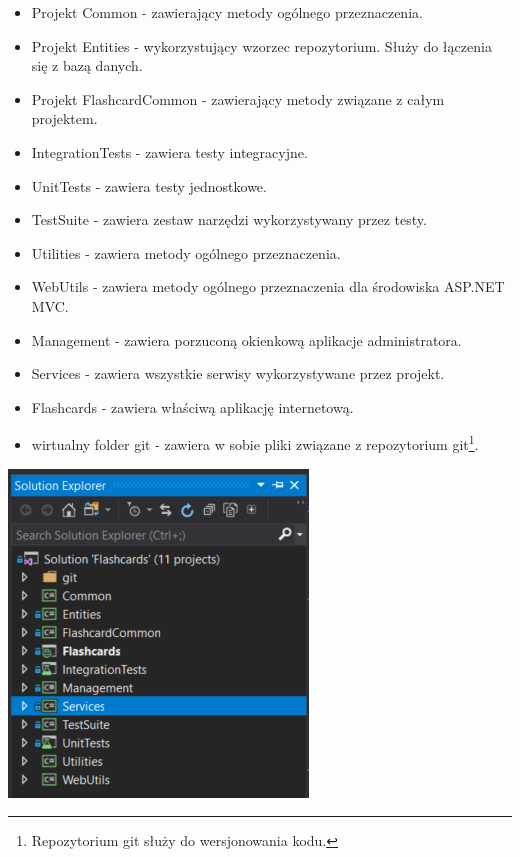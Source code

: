 \begin{itemize}
	\item Projekt Common - zawierający metody ogólnego przeznaczenia.
	\item Projekt Entities - wykorzystujący wzorzec repozytorium. Służy do łączenia się z bazą danych.
	\item Projekt FlashcardCommon - zawierający metody związane z całym projektem.
	\item IntegrationTests - zawiera testy integracyjne.
	\item UnitTests - zawiera testy jednostkowe.
	\item TestSuite - zawiera zestaw narzędzi wykorzystywany przez testy. 
	\item Utilities - zawiera metody ogólnego przeznaczenia. 
	\item WebUtils - zawiera metody ogólnego przeznaczenia dla środowiska ASP.NET MVC.
	\item Management - zawiera porzuconą okienkową aplikacje administratora.
	\item Services - zawiera wszystkie serwisy wykorzystywane przez projekt.
	\item Flashcards - zawiera właściwą aplikację internetową.
	\item wirtualny folder git - zawiera w sobie pliki związane z repozytorium git\footnote{Repozytorium git służy do wersjonowania kodu.}.
\end{itemize}

\begin{center}
	\includegraphics{images/Solution.png}
\end{center}

